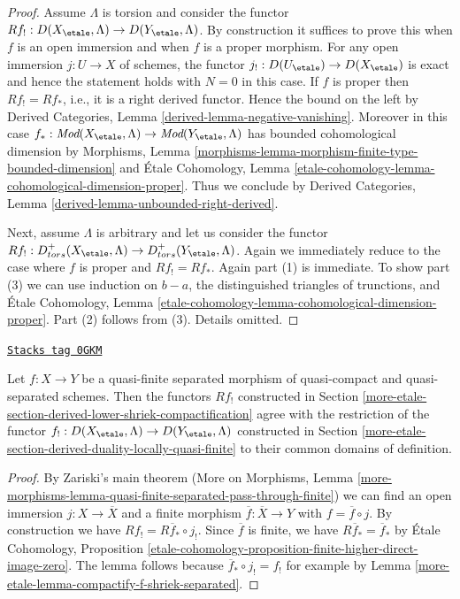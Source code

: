 \begin{proof}
Assume $\Lambda$ is torsion and consider the functor
$Rf_! : D(X_\etale, \Lambda) \to D(Y_\etale, \Lambda)$.
By construction it suffices to prove this when $f$ is an open immersion
and when $f$ is a proper morphism. For any open immersion $j : U \to X$
of schemes, the functor $j_! : D(U_\etale) \to D(X_\etale)$ is exact
and hence the statement holds with $N = 0$ in this case.
If $f$ is proper then $Rf_! = Rf_*$, i.e., it is a right derived
functor. Hence the bound on the left by
Derived Categories, Lemma \ref{derived-lemma-negative-vanishing}.
Moreover in this case $f_* : \textit{Mod}(X_\etale, \Lambda)
\to \textit{Mod}(Y_\etale, \Lambda)$ has bounded cohomological dimension by
Morphisms, Lemma \ref{morphisms-lemma-morphism-finite-type-bounded-dimension}
and \'Etale Cohomology, Lemma
\ref{etale-cohomology-lemma-cohomological-dimension-proper}.
Thus we conclude by
Derived Categories, Lemma \ref{derived-lemma-unbounded-right-derived}.

\medskip\noindent
Next, assume $\Lambda$ is arbitrary and let us consider the functor
$Rf_! : D^+_{tors}(X_\etale, \Lambda) \to D^+_{tors}(Y_\etale, \Lambda)$.
Again we immediately reduce to the case where $f$ is proper and
$Rf_! = Rf_*$. Again part (1) is immediate. To show part (3)
we can use induction on $b - a$, the distinguished
triangles of trunctions, and \'Etale Cohomology, Lemma
\ref{etale-cohomology-lemma-cohomological-dimension-proper}.
Part (2) follows from (3). Details omitted.
\end{proof}

\begin{lemma}
\label{more-etale-lemma-Rf-shriek-for-quasi-finite}
\href{https://stacks.math.columbia.edu/tag/0GKM}{\texttt{Stacks tag 0GKM}}

Let $f : X \to Y$ be a quasi-finite separated morphism of quasi-compact and
quasi-separated schemes. Then the functors $Rf_!$ constructed in
Section \ref{more-etale-section-derived-lower-shriek-compactification}
agree with the restriction of the functor
$f_! : D(X_\etale, \Lambda) \to D(Y_\etale, \Lambda)$
constructed in Section \ref{more-etale-section-derived-duality-locally-quasi-finite}
to their common domains of definition.
\end{lemma}

\begin{proof}
By Zariski's main theorem (More on Morphisms, Lemma
\ref{more-morphisms-lemma-quasi-finite-separated-pass-through-finite})
we can find an open immersion $j : X \to \overline{X}$ and a finite morphism
$\overline{f} : \overline{X} \to Y$ with $f = \overline{f} \circ j$.
By construction we have $Rf_! = R\overline{f}_* \circ j_!$.
Since $\overline{f}$ is finite, we have $R\overline{f}_* = \overline{f}_*$
by \'Etale Cohomology, Proposition
\ref{etale-cohomology-proposition-finite-higher-direct-image-zero}.
The lemma follows because $\overline{f}_* \circ j_! = f_!$
for example by Lemma \ref{more-etale-lemma-compactify-f-shriek-separated}.
\end{proof}


